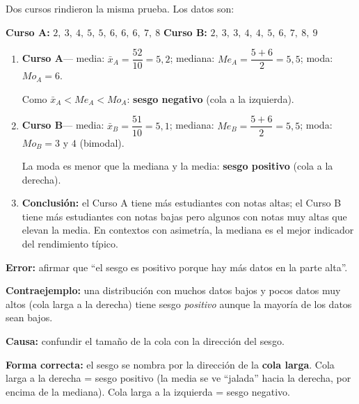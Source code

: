 \documentclass[11pt, letterpaper]{article}
\begin{document}
\begin{tcolorbox}[examplebox, title={Ej. 13. Identificar la forma de una distribuci\'on}]
Dos cursos rindieron la misma prueba. Los datos son:

\textbf{Curso A:} $2,\ 3,\ 4,\ 5,\ 5,\ 6,\ 6,\ 6,\ 7,\ 8$
\quad\textbf{Curso B:} $2,\ 3,\ 3,\ 4,\ 4,\ 5,\ 6,\ 7,\ 8,\ 9$

\begin{enumerate}[label=\textbf{Paso \arabic*.}]
  \item \textbf{Curso A}--- media: $\bar{x}_A = \dfrac{52}{10} = 5{,}2$;\; mediana: $Me_A = \dfrac{5+6}{2} = 5{,}5$;\; moda: $Mo_A = 6$.

  Como $\bar{x}_A < Me_A < Mo_A$: \textbf{sesgo negativo} (cola a la izquierda).

  \medskip
  \item \textbf{Curso B}--- media: $\bar{x}_B = \dfrac{51}{10} = 5{,}1$;\; mediana: $Me_B = \dfrac{5+6}{2} = 5{,}5$;\; moda: $Mo_B = 3$ y $4$ (bimodal).

  La moda es menor que la mediana y la media: \textbf{sesgo positivo} (cola a la derecha).

  \medskip
  \item \textbf{Conclusi\'on:} el Curso A tiene m\'as estudiantes con notas altas; el Curso B tiene m\'as estudiantes con notas bajas pero algunos con notas muy altas que elevan la media. En contextos con asimetr\'ia, la mediana es el mejor indicador del rendimiento t\'ipico.
\end{enumerate}
\end{tcolorbox}

\begin{tcolorbox}[warningbox, title={Error frecuente: describir el sesgo por la cola pero confundir la direcci\'on}]
\textbf{Error:} afirmar que ``el sesgo es positivo porque hay m\'as datos en la parte alta''.

\medskip
\textbf{Contraejemplo:} una distribuci\'on con muchos datos bajos y pocos datos muy altos (cola larga a la derecha) tiene sesgo \textit{positivo} aunque la mayor\'ia de los datos sean bajos.

\medskip
\textbf{Causa:} confundir el tama\~no de la cola con la direcci\'on del sesgo.

\medskip
\textbf{Forma correcta:} el sesgo se nombra por la direcci\'on de la \textbf{cola larga}. Cola larga a la derecha = sesgo positivo (la media se ve ``jalada'' hacia la derecha, por encima de la mediana). Cola larga a la izquierda = sesgo negativo.
\end{tcolorbox}
\end{document}
